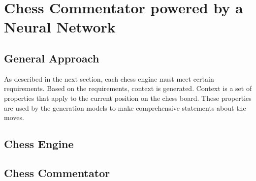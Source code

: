 \section{Chess Commentator powered by a Neural Network}

\subsection{General Approach}


As described in the next section, each chess engine must meet certain requirements. Based on the requirements, context is generated. Context is a set of properties that apply to the current position on the chess board. These properties are used by the generation models to make comprehensive statements about the moves.


\subsection{Chess Engine}







\subsection{Chess Commentator}

